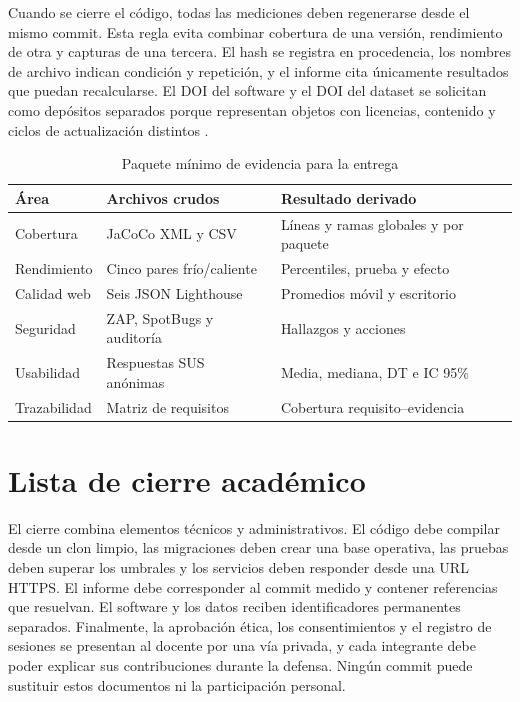 \documentclass[11pt,a4paper]{report}
\begin{document}
Cuando se cierre el código, todas las mediciones deben regenerarse desde el mismo
commit. Esta regla evita combinar cobertura de una versión, rendimiento de otra y
capturas de una tercera. El hash se registra en procedencia, los nombres de archivo
indican condición y repetición, y el informe cita únicamente resultados que puedan
recalcularse. El DOI del software y el DOI del dataset se solicitan como depósitos
separados porque representan objetos con licencias, contenido y ciclos de actualización
distintos \cite{smith2016software}.

\begin{table}[htbp]
\centering
\caption{Paquete mínimo de evidencia para la entrega}
\begin{tabularx}{\textwidth}{p{3.0cm}X X}
\toprule
\textbf{Área} & \textbf{Archivos crudos} & \textbf{Resultado derivado} \\
\midrule
Cobertura & JaCoCo XML y CSV & Líneas y ramas globales y por paquete \\
Rendimiento & Cinco pares frío/caliente & Percentiles, prueba y efecto \\
Calidad web & Seis JSON Lighthouse & Promedios móvil y escritorio \\
Seguridad & ZAP, SpotBugs y auditoría & Hallazgos y acciones \\
Usabilidad & Respuestas SUS anónimas & Media, mediana, DT e IC 95\% \\
Trazabilidad & Matriz de requisitos & Cobertura requisito--evidencia \\
\bottomrule
\end{tabularx}
\end{table}

\section{Lista de cierre académico}

El cierre combina elementos técnicos y administrativos. El código debe compilar desde
un clon limpio, las migraciones deben crear una base operativa, las pruebas deben
superar los umbrales y los servicios deben responder desde una URL HTTPS. El informe
debe corresponder al commit medido y contener referencias que resuelvan. El software
y los datos reciben identificadores permanentes separados. Finalmente, la aprobación
ética, los consentimientos y el registro de sesiones se presentan al docente por una
vía privada, y cada integrante debe poder explicar sus contribuciones durante la
defensa. Ningún commit puede sustituir estos documentos ni la participación personal.
\end{document}
